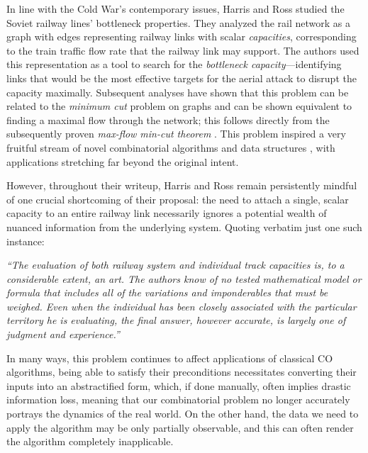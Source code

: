 \documentclass[twoside,11pt]{article}
\begin{document}
In line with the Cold War's contemporary issues, Harris and Ross studied the Soviet railway lines' bottleneck properties. They analyzed the rail network as a graph with edges representing railway links with scalar \emph{capacities}, corresponding to the train traffic flow rate that the railway link may support. The authors used this representation as a tool to search for the \emph{bottleneck capacity}---identifying links that would be the most effective targets for the aerial attack to disrupt the capacity maximally. Subsequent analyses have shown that this problem can be related to the \emph{minimum cut} problem on graphs and can be shown equivalent to finding a maximal flow through the network; this follows directly from the subsequently proven \emph{max-flow min-cut theorem} \citep{ford2015flows}. This problem inspired a very fruitful stream of novel combinatorial algorithms and data structures \citep{ford1956maximal,edmonds1972theoretical,Dinic1970,Sleator1983,goldberg1988new}, with applications stretching far beyond the original intent.

However, throughout their writeup, Harris and Ross remain persistently mindful of one crucial shortcoming of their proposal: the need to attach a single, scalar capacity to an entire railway link necessarily ignores a potential wealth of nuanced information from the underlying system. Quoting verbatim just one such instance:
\begin{displayquote}
	\emph{``The evaluation of both railway system and individual track capacities is, to a considerable extent, an art. The authors know of no tested mathematical model or formula that includes all of the variations and imponderables that must be weighed. Even when the individual has been closely associated with the particular territory he is evaluating, the final answer, however accurate, is largely one of judgment and experience.''}
\end{displayquote}
In many ways, this problem continues to affect applications of classical CO algorithms, being able to satisfy their preconditions necessitates converting their inputs into an abstractified form, which, if done manually, often implies drastic information loss, meaning that our combinatorial problem no longer accurately portrays the dynamics of the real world. On the other hand, the data we need to apply the algorithm may be only {partially observable}, and this can often render the algorithm completely inapplicable. %
\end{document}
